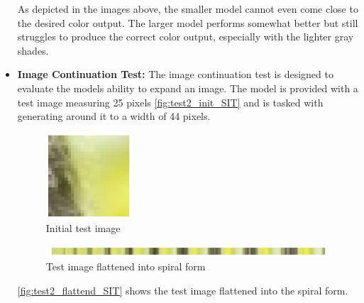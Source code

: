 \begin{itemize}
        As depicted in the images above, the smaller model cannot even come close to the desired color output. The larger model performs somewhat better but still struggles to produce the correct color output, especially with the lighter gray shades.
        
        \item \textbf{Image Continuation Test:} The image continuation test is designed to evaluate the models ability to expand an image. The model is provided with a test image measuring 25 pixels \autoref{fig:test2_init_SIT} and is tasked with generating around it to a width of 44 pixels.

        \begin{figure}[H]
            \centering
            \includegraphics[width=0.3\textwidth]{imgs/ImageTest_5.0.1.0_init.png}
            \caption{Initial test image}
            \label{fig:test2_init_SIT}
        \end{figure}
        
        \begin{figure}[H]
            \centering
            \includegraphics[width=\textwidth]{imgs/ImageTest_5.0.1.0_flattend.png}
            \caption{Test image flattened into spiral form}
            \label{fig:test2_flattend_SIT}
        \end{figure}
        
        \autoref{fig:test2_flattend_SIT} shows the test image flattened into the spiral form.
        

\end{itemize}
